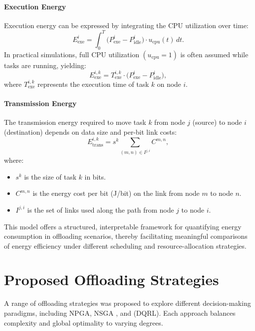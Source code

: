 \documentclass[preprint,12pt]{elsarticle}
\begin{document}
\paragraph{Execution Energy}
Execution energy can be expressed by integrating the CPU utilization over time:
\begin{equation}
E_{\text{exe}}^{i} = \int_{0}^{T} \bigl(P_{\text{exe}}^{i} - P_{\text{idle}}^{i}\bigr) \cdot u_{\text{cpu}}(t) \, dt.
\end{equation}
In practical simulations, full CPU utilization \((u_{\text{cpu}} = 1)\) is often assumed while tasks are running, yielding:
\begin{equation}
E_{\text{exe}}^{i,k} = T_{\text{exe}}^{i,k} \cdot \bigl(P_{\text{exe}}^{i} - P_{\text{idle}}^{i}\bigr),
\end{equation}
where \(T_{\text{exe}}^{i,k}\) represents the execution time of task \(k\) on node \(i\).

\paragraph{Transmission Energy}
The transmission energy required to move task \(k\) from node \(j\) (source) to node \(i\) (destination) depends on data size and per-bit link costs:
\begin{equation}
E_{\text{trans}}^{i,k} = s^{k} \sum_{(m,n) \in I^{j,i}} C^{m,n},
\end{equation}
where:
\begin{itemize}
    \item \(s^{k}\) is the size of task \(k\) in bits.
    \item \(C^{m,n}\) is the energy cost per bit (J/bit) on the link from node \(m\) to node \(n\).
    \item \(I^{j,i}\) is the set of links used along the path from node \(j\) to node \(i\).
\end{itemize}

This model offers a structured, interpretable framework for quantifying energy consumption in offloading scenarios, thereby facilitating meaningful comparisons of energy efficiency under different scheduling and resource-allocation strategies.


\section{Proposed Offloading Strategies}
\label{sec:offloading_strategies}


A range of offloading strategies was proposed to explore different decision-making paradigms, including NPGA, NSGA , and (DQRL). Each approach balances complexity and global optimality to varying degrees.
\end{document}
